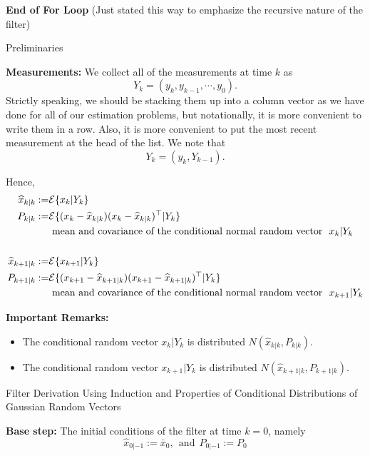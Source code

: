\documentclass[letterpaper]{article}
\newcommand{\ExpectofGiven}[2]{{\cal E} \{ #1 | #2 \}}
\begin{document}
\textbf{End of For Loop} (Just stated this way to emphasize the recursive nature of the filter)

 \newpage

  {\Large \bf
\begin{center}
 Preliminaries
\end{center}
}

 \noindent \textbf{Measurements:} We collect all of the measurements at time $k$ as
 $$Y_k = (y_k, y_{k-1}, \cdots, y_0).$$
 Strictly speaking, we should be stacking them up into a column vector as we have done for all of our estimation problems, but notationally, it is more convenient to write them in a row.  Also, it is more convenient to put the most recent measurement at the head of the list. We note that
 $$Y_k = ( y_k, Y_{k-1}).$$

 Hence,
\begin{align*}
\widehat{x}_{k|k} :=& \ExpectofGiven{x_k}{Y_k}\\
P_{k|k} :=& \ExpectofGiven{(x_k-\widehat{x}_{k|k})(x_k-\widehat{x}_{k|k})^\top}{Y_k}\\
&~ \text{mean and covariance of the conditional normal random vector} ~~x_{k} | Y_k\\
& \\
\widehat{x}_{k+1|k} := &\ExpectofGiven{ x_{k+1} }{ Y_k}\\
P_{k+1|k}:=& \ExpectofGiven{(x_{k+1}-\widehat{x}_{k+1|k})(x_{k+1}-\widehat{x}_{k+1|k})^\top}{Y_k}\\
&~ \text{mean and covariance of the conditional normal random vector} ~~x_{k+1} | Y_k\\
\end{align*}

\textbf{Important Remarks:}
\begin{itemize}
\setlength{\itemsep}{.5cm}
\item The conditional random vector $ x_k | Y_k $ is distributed $N(\widehat{x}_{k|k}, P_{k|k})$.
\item  The conditional random vector $ x_{k+1} | Y_{k} $ is distributed $N(\widehat{x}_{k+1|k}, P_{k+1|k})$.
\end{itemize}

 \newpage
 {\Large \bf
\begin{center}
 Filter Derivation Using Induction and Properties of Conditional Distributions of Gaussian Random Vectors
\end{center}
}

\noindent \textbf{Base step:} The initial conditions of the filter at time $k=0$, namely
$$ \widehat{x}_{0|-1} :=\bar{x}_0,~~\mbox{and}~~P_{0|-1}:=P_0$$
\end{document}
